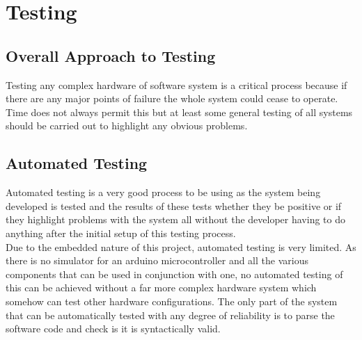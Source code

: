 \chapter{Testing}



\section{Overall Approach to Testing}
Testing any complex hardware of software system is a critical process because if there are any major points of failure the whole system could cease to operate.  Time does not always permit this but at least some general testing of all systems should be carried out to highlight any obvious problems.
\section{Automated Testing}
Automated testing is a very good process to be using as the system being developed is tested and the results of these tests whether they be positive or if they highlight problems with the system all without the developer having to do anything after the initial setup of this testing process.
\\Due to the embedded nature of this project, automated testing is very limited.  As there is no simulator for an arduino microcontroller and all the various components that can be used in conjunction with one, no automated testing of this can be achieved without a far more complex hardware system which somehow can test other hardware configurations.  The only part of the system that can be automatically tested with any degree of reliability is to parse the software code and check is it is syntactically valid.
